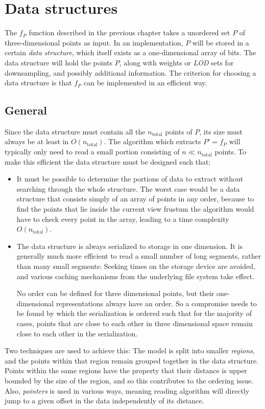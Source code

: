 \documentclass[a4paper,10pt,abstracton,notitlepage]{scrreprt}
\begin{document}
\chapter{Data structures}
The $f_{P}$ function described in the previous chapter takes a unordered set $P$ of three-dimensional points as input. In an implementation, $P$ will be stored in a certain \emph{data structure}, which itself exists as a one-dimensional array of bits. The data structure will hold the points $P$, along with weights or \emph{LOD} sets for downsampling, and possibly additional information. The criterion for choosing a data structure is that $f_{P}$ can be implemented in an efficient way.

\section{General}
Since the data structure must contain all the $n_{\text{total}}$ points of $P$, its size must always be at least in $O(n_{\text{total}})$. The algorithm which extracts $P' = f_{P}$ will typically only need to read a small portion consisting of $n \ll n_{\text{total}}$ points. To make this efficient the data structure must be designed such that:
\begin{itemize}
\item It must be possible to determine the portions of data to extract without searching through the whole structure. The worst case would be a data structure that consists simply of an array of points in any order, because to find the points that lie inside the current view frustum the algorithm would have to check every point in the array, leading to a time complexity $O(n_{\text{total}})$.
\item The data structure is always serialized to storage in one dimension. It is generally much more efficient to read a small number of long segments, rather than many small segments: Seeking times on the storage device are avoided, and various caching mechanisms from the underlying file system take effect.

No order can be defined for three dimensional points, but their one-dimensional representations always have an order. So a compromise needs to be found by which the serialization is ordered such that for the majority of cases, points that are close to each other in three dimensional space remain close to each other in the serialization.
\end{itemize}

Two techniques are used to achieve this: The model is split into smaller \emph{regions}, and the points within that region remain grouped together in the data structure. Points within the same regions have the property that their distance is upper bounded by the size of the region, and so this contributes to the ordering issue. Also, \emph{pointers} is used in various ways, meaning reading algorithm will directly jump to a given offset in the data independently of its distance.
\end{document}
